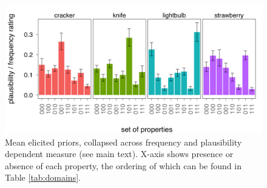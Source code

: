 \documentclass{llncs} %
\newcommand{\denote}[1]{\mbox{ $[\![ #1 ]\!]$}}
\begin{document}
\begin{figure}
\centering
    \includegraphics[width=\columnwidth]{priors}
    \caption{Mean elicited priors, collapsed across frequency and plausibility dependent measure (see main text). X-axis shows presence or absence of each property, the ordering of which can be found in Table \ref{tab:domains}.}
  \label{fig:priors}
\end{figure}






\end{document}
